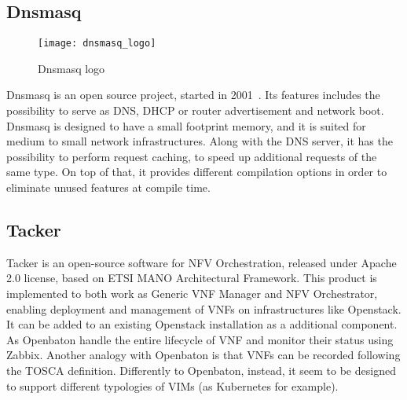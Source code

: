 \subsection{Dnsmasq}
\begin{figure}[h]
  \centering \texttt{[image: dnsmasq\_logo]}
  \caption{Dnsmasq logo}
  \label{chap:prjan:img:dnsmasq_logo}
\end{figure}
Dnsmasq is an open source project, started in 2001~\cite{dnsmasqweb}. Its
features includes the possibility to serve as DNS, DHCP or router advertisement
and network boot. Dnsmasq is designed to have a small footprint memory, and it
is suited for medium to small network infrastructures. Along with the DNS
server, it has the possibility to perform request caching, to speed up
additional requests of the same type. On top of that, it provides different
compilation options in order to eliminate unused features at compile time.

\subsection{Tacker}
Tacker is an open-source software for NFV Orchestration, released under Apache
2.0 license, based on ETSI MANO Architectural Framework. This product is
implemented to both work as Generic VNF Manager and NFV Orchestrator, enabling
deployment and management of VNFs on infrastructures like Openstack. It can be
added to an existing Openstack installation as a additional component. As
Openbaton handle the entire lifecycle of VNF and monitor their status using
Zabbix. Another analogy with Openbaton is that VNFs can be recorded following
the TOSCA definition. Differently to Openbaton, instead, it seem to be designed
to support different typologies of VIMs (as Kubernetes for example). 
